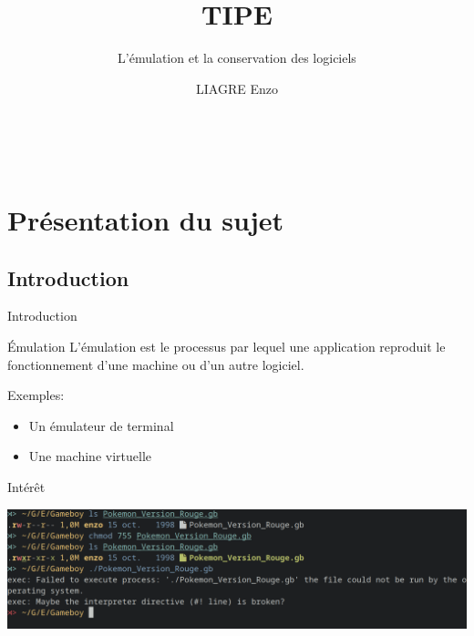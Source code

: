 \documentclass{beamer}
\title{TIPE}
\author{L'émulation et la conservation des logiciels}
\institute{}
\date{\scriptsize LIAGRE Enzo}
\begin{document}
    
    \begin{frame}
        \titlepage\
    \end{frame}

    
    
    \section{Présentation du sujet}
    \subsection{Introduction}

    \begin{frame}{Introduction}
        \begin{block}{Émulation}
            L'émulation est le processus par lequel une application reproduit le fonctionnement d'une machine ou d'un autre logiciel.
        \end{block}
        Exemples:
        \begin{itemize}
            \item Un émulateur de terminal
            \item Une machine virtuelle
        \end{itemize}
    \end{frame}

    \begin{frame}{Intérêt}
        \begin{center} 
            \includegraphics[width=1\textwidth]{images/erreur_permission.png}
        \end{center}   
    \end{frame}
\end{document}

